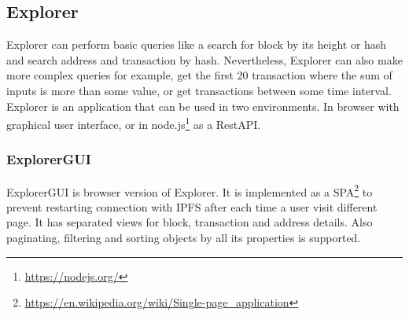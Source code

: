 




\subsection{Explorer}
Explorer can perform basic queries like a search for block by its height or hash and search address and transaction by hash. Nevertheless, Explorer can also make more complex queries for example, get the first 20 transaction where the sum of inputs is more than some value, or get transactions between some time interval. Explorer is an application that can be used in two environments. In browser with graphical user interface, or in node.js\footnote{\url{https://nodejs.org/}} as a RestAPI.

\subsubsection{ExplorerGUI}
ExplorerGUI is browser version of Explorer. It is implemented as a SPA\footnote{\url{https://en.wikipedia.org/wiki/Single-page_application}} to prevent restarting connection with IPFS after each time a user visit different page. It has separated views for block, transaction and address details. Also paginating, filtering and sorting objects by all its properties is supported.


